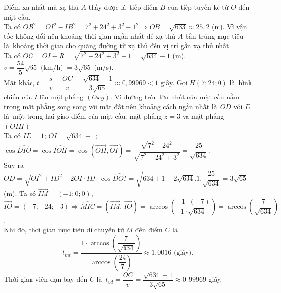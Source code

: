 \begin{ex}
{{		 }
		\begin{itemchoice}
			\itemch Điểm xa nhất mà xạ thủ $A$ thấy được là~tiếp điểm $B$ của tiếp tuyến kẻ  từ $O$ đến mặt cầu.\\
			Ta có $OB^2=OI^2-IB^2=7^2+{{24}^2}+3^2-1^2\Rightarrow OB=\sqrt{633}\approx  25{,}2$ (m).
			\itemch Vì vận tốc không đổi nên khoảng thời gian ngắn nhất để xạ thủ $A$ bắn trúng mục tiêu là~khoảng thời gian cho quãng đường từ xạ thủ đến vị trí  gần xạ thủ nhất.\\
			Ta có $OC=OI-R=\sqrt{7^2+{{24}^2}+3^2}-1=\sqrt{634}-1$ (m).\\ 
			$v=\dfrac{54}{5}\sqrt{65}$ (km/h) $=3\sqrt{65}$  (m/s).\\
			Mặt khác, $t=\dfrac{s}{v}=\dfrac{OC}{v}=\dfrac{\sqrt{634}-1}{3\sqrt{65}}\approx 0{,}99969<1$ giây. 
			\itemch 
			Gọi $H(7;24;0)$ là~hình chiếu của $I$ lên mặt phẳng $(Oxy)$. Vì đường tròn lớn nhất của mặt cầu nằm trong mặt phẳng song song với mặt đất nên khoảng cách ngắn nhất là~$OD$ với $D$ là~một trong  hai giao điểm của mặt cầu, mặt phẳng $z=3$ và mặt phẳng $(OIH)$.\\
			 Ta có $ID=1$; $OI=\sqrt{634}-1$; $\cos \widehat{DIO}=\cos \widehat{IOH}=\cos (\overrightarrow{OH},\overrightarrow{OI})=\dfrac{\sqrt{7^2+{{24}^2}}}{\sqrt{7^2+{{24}^2}+3^2}}=\dfrac{25}{\sqrt{634}}$.\\
			Suy ra $OD=\sqrt{OI^2+ID^2-2OI\cdot  ID\cdot\cos \widehat{DOI}}=\sqrt{634+1-2\sqrt{634}.1.\dfrac{25}{\sqrt{634}}}=3\sqrt{65}$ (m).
			\itemch 
			 Ta có $\overrightarrow{IM}=(-1;0;0)$, $\overrightarrow{IO}=(-7;-24;-3)\Rightarrow \widehat{MIC}=(\overrightarrow{IM},\,\overrightarrow{IO})=\arccos \left(\dfrac{-1\cdot(-7)}{1\cdot\sqrt{634}} \right)=\arccos \left(\dfrac{7}{\sqrt{634}} \right)$.\\
			Khi đó, thời  gian mục tiêu di chuyển từ $M$ đến điểm $C$ là~\[{t_{mt}}=\dfrac{1\cdot\arccos \left(\dfrac{7}{\sqrt{634}} \right)}{\arccos \left( \dfrac{24}{7} \right) }\approx 1{,}0016 \text{ (giây)}.\]
			Thời gian viên  đạn bay đến $C$ là~${t_{vd}}=\dfrac{OC}{v}=\dfrac{\sqrt{634}-1}{3\sqrt{65}}\approx 0{,}99969$ giây.
		\end{itemchoice}
	} 
\end{ex}

